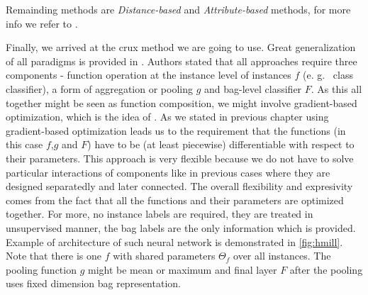 Remainding methods are \emph{Distance-based} and \emph{Attribute-based} methods, for more info we refer to \cite{Amores2013}.

Finally, we arrived at the crux method we are going to use. Great generalization of all paradigms is provided in \cite{Mandlik2020}. Authors stated that all approaches require three components - function operation at the instance level of instances $f$ (e. g. \ class classifier), a form of aggregation or pooling $g$ and bag-level classifier $F$. As this all together might be seen as function composition, we might involve gradient-based optimization, which is the idea of \cite{Pevny2016a, Edwards2017}. As we stated in previous chapter using gradient-based optimization leads us to the requirement that the functions (in this case $f$,$g$ and $F$) have to be (at least piecewise) differentiable with respect to their parameters. This approach is very flexible because we do not have to solve particular interactions of components like in previous cases where they are designed separatedly and later connected. The overall flexibility and expresivity comes from the fact that all the functions and their parameters are optimized together. For more, no instance labels are required, they are treated in unsupervised manner, the bag labels are the only information which is provided. Example of architecture of such neural network is demonstrated in \ref{fig:hmill}. Note that there is one $f$ with shared parameters $\Theta_{f}$ over all instances. The pooling function $g$ might be mean or maximum and final layer $F$ after the pooling uses fixed dimension bag representation.


